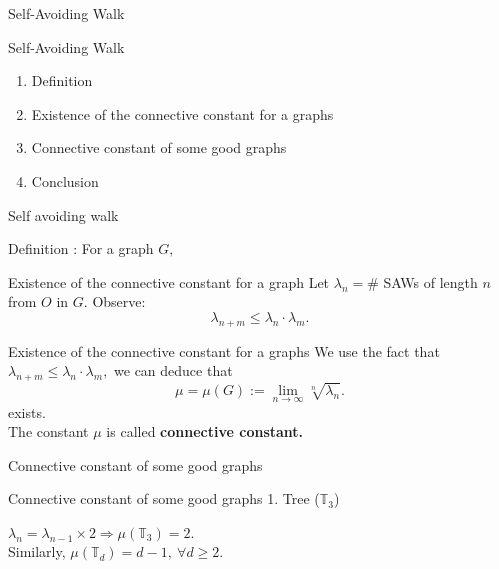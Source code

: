 \documentclass{beamer}
\begin{document}
\begin{frame}{Self-Avoiding Walk}
    \begin{center}
        \Large Self-Avoiding Walk
    \end{center}
    \begin{enumerate}
        \item Definition
        \item Existence of the connective constant for a graphs
        \item Connective constant of some good graphs
        \item Conclusion
    \end{enumerate}
\end{frame}
\begin{frame}{Self avoiding walk}

Definition : For a graph $G,$
\begin{figure}[h]
    \centering
    
\end{figure}
\end{frame}
\begin{frame}{Existence of the connective constant for a graph}
Let $\lambda_n=\#$ SAWs of length $n$ from $O$ in $G.$
    Observe:
    \[
    \lambda_{n+m}\leq \lambda_n\cdot \lambda_m.
    \]
\begin{figure}[h]
    \centering
    
\end{figure}
\end{frame}
\begin{frame}{Existence of the connective constant for a graphs}
    We use the fact that $\lambda_{n+m}\leq \lambda_n\cdot\lambda_m,$ we can deduce that 
    \[
    \mu=\mu(G):=\lim_{n\to\infty}\sqrt[n]{\lambda_n}.
    \]
    exists.\\[5pt]
    The constant $\mu$ is called \textbf{connective constant.}
\end{frame}
\begin{frame}{Connective constant of some good graphs}
    \begin{figure}[htp]
        \centering
        
    \end{figure}
\end{frame}
\begin{frame}{Connective constant of some good graphs}
    1. Tree ($\mathbb{T}_3$)
    \begin{figure}
    \flushleft
    
\end{figure}
    $\lambda_n=\lambda_{n-1}\times 2\Rightarrow \mu(\mathbb{T}_3)=2.$\\
    \vspace{5cm}
    Similarly, $\mu(\mathbb{T}_d)=d-1,\ \forall d\geq 2.$
\end{frame}
\end{document}

